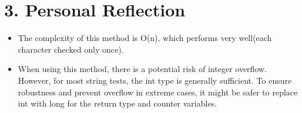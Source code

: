 \documentclass[12pt,a4paper]{article}
\begin{document}
\section*{3. Personal Reflection}

\begin{itemize}
\item The complexity of this method is O(n), which performs very well(each character checked only once). 
\item When using this method, there is a potential risk of integer overflow. However, for most string tests, the int type is generally sufficient. To ensure robustness and prevent overflow in extreme cases, it might be safer to replace int with long for the return type and counter variables.

\end{itemize}
\end{document}
